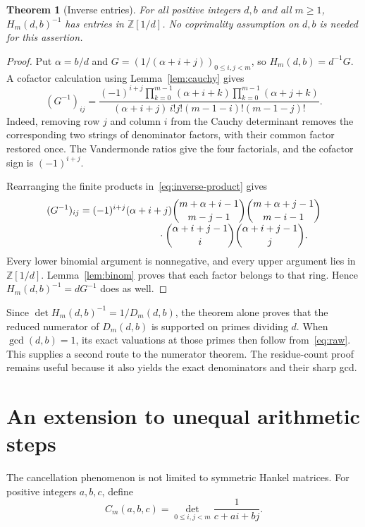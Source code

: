 \documentclass[11pt,a4paper]{article}
\newtheorem{theorem}{Theorem}[section]
\theoremstyle{definition}
\theoremstyle{remark}
\newcommand{\Z}{\mathbb Z}
\begin{document}
\begin{theorem}[Inverse entries]
\label{thm:inverse}
For all positive integers $d,b$ and all $m\ge1$,
$H_m(d,b)^{-1}$ has entries in $\Z[1/d]$.
No coprimality assumption on $d,b$ is needed for this assertion.
\end{theorem}
\begin{proof}
Put $\alpha=b/d$ and $G=(1/(\alpha+i+j))_{0\le i,j<m}$, so
$H_m(d,b)=d^{-1}G$. A cofactor calculation using
Lemma~\ref{lem:cauchy} gives
\begin{equation}
 (G^{-1})_{ij}
 =\frac{(-1)^{i+j}
   \displaystyle\prod_{k=0}^{m-1}(\alpha+i+k)
   \displaystyle\prod_{k=0}^{m-1}(\alpha+j+k)}
  {(\alpha+i+j)\,i!j!(m-1-i)!(m-1-j)!}.
 \label{eq:inverse-product}
\end{equation}
Indeed, removing row $j$ and column $i$ from the Cauchy determinant removes
the corresponding two strings of denominator factors, with their common
factor restored once. The Vandermonde ratios give the four factorials,
and the cofactor sign is $(-1)^{i+j}$.

Rearranging the finite products in~\eqref{eq:inverse-product} gives
\begin{align}
 (G^{-1})_{ij}
 &=(-1)^{i+j}(\alpha+i+j)
 \binom{m+\alpha+i-1}{m-j-1}
 \binom{m+\alpha+j-1}{m-i-1}\notag\\[-1mm]
 &\hspace{28mm}\cdot
 \binom{\alpha+i+j-1}{i}
 \binom{\alpha+i+j-1}{j}.
 \label{eq:inverse-binomial}
\end{align}
Every lower binomial argument is nonnegative, and every upper argument lies
in $\Z[1/d]$. Lemma~\ref{lem:binom} proves that each factor belongs to
that ring. Hence $H_m(d,b)^{-1}=dG^{-1}$ does as well.
\end{proof}

Since $\det H_m(d,b)^{-1}=1/D_m(d,b)$, the theorem alone proves that the
reduced numerator of $D_m(d,b)$ is supported on primes dividing $d$.
When $\gcd(d,b)=1$, its exact valuations at those primes then follow
from~\eqref{eq:raw}. This supplies a second route to the numerator theorem.
The residue-count proof remains useful because it also yields the exact
denominators and their sharp gcd.

\section{An extension to unequal arithmetic steps}
\label{sec:two-steps}

The cancellation phenomenon is not limited to symmetric Hankel matrices.
For positive integers $a,b,c$, define
\[
 C_m(a,b,c)=\det_{0\le i,j<m}\frac1{c+ai+bj}.
\]
\end{document}
